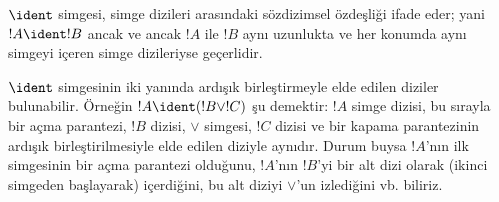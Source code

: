 \begin{defn}
$\ident$ simgesi, simge dizileri arasındaki sözdizimsel özdeşliği ifade
eder; yani $!A \ident !B$ ancak ve ancak $!A$ ile $!B$ aynı uzunlukta ve her
konumda aynı simgeyi içeren simge dizileriyse geçerlidir.
\end{defn}

$\ident$ simgesinin iki yanında ardışık birleştirmeyle elde edilen diziler
bulunabilir. Örneğin $!A \ident (!B \lor !C)$ şu demektir: $!A$ simge dizisi,
bu sırayla bir açma parantezi, $!B$ dizisi, $\lor$ simgesi, $!C$ dizisi ve
bir kapama parantezinin ardışık birleştirilmesiyle elde edilen diziyle
aynıdır. Durum buysa $!A$'nın ilk simgesinin bir açma parantezi olduğunu,
$!A$'nın $!B$'yi bir alt dizi olarak (ikinci simgeden başlayarak) içerdiğini,
bu alt diziyi $\lor$'un izlediğini vb. biliriz.

